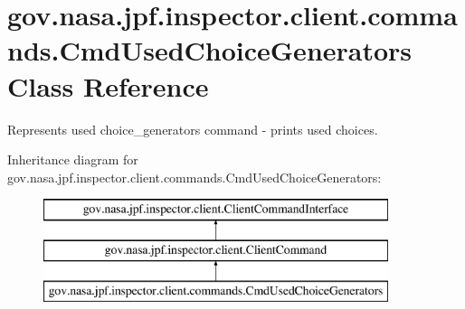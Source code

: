 \hypertarget{classgov_1_1nasa_1_1jpf_1_1inspector_1_1client_1_1commands_1_1_cmd_used_choice_generators}{}\section{gov.\+nasa.\+jpf.\+inspector.\+client.\+commands.\+Cmd\+Used\+Choice\+Generators Class Reference}
\label{classgov_1_1nasa_1_1jpf_1_1inspector_1_1client_1_1commands_1_1_cmd_used_choice_generators}


Represents used choice\+\_\+generators command -\/ prints used choices.  


Inheritance diagram for gov.\+nasa.\+jpf.\+inspector.\+client.\+commands.\+Cmd\+Used\+Choice\+Generators\+:\begin{figure}[H]
\begin{center}
\leavevmode
\includegraphics[height=3.000000cm]{classgov_1_1nasa_1_1jpf_1_1inspector_1_1client_1_1commands_1_1_cmd_used_choice_generators}
\end{center}
\end{figure}
